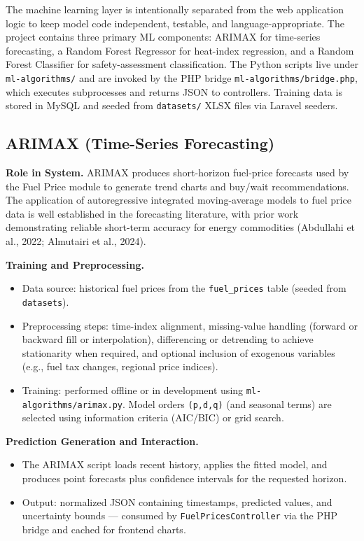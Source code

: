 \documentclass[12pt]{article}
\begin{document}
The machine learning layer is intentionally separated from the web application logic to keep model code independent, testable, and language-appropriate. The project contains three primary ML components: ARIMAX for time-series forecasting, a Random Forest Regressor for heat-index regression, and a Random Forest Classifier for safety-assessment classification. The Python scripts live under \texttt{ml-algorithms/} and are invoked by the PHP bridge \texttt{ml-algorithms/bridge.php}, which executes subprocesses and returns JSON to controllers. Training data is stored in MySQL and seeded from \texttt{datasets/} XLSX files via Laravel seeders.

\subsection{ARIMAX (Time-Series Forecasting)}

\noindent\textbf{Role in System.} ARIMAX produces short-horizon fuel-price forecasts used by the Fuel Price module to generate trend charts and buy/wait recommendations. The application of autoregressive integrated moving-average models to fuel price data is well established in the forecasting literature, with prior work demonstrating reliable short-term accuracy for energy commodities (Abdullahi et al., 2022; Almutairi et al., 2024).

\noindent\textbf{Training and Preprocessing.}
\begin{itemize}
    \item Data source: historical fuel prices from the \texttt{fuel\_prices} table (seeded from \texttt{datasets}).
    \item Preprocessing steps: time-index alignment, missing-value handling (forward or backward fill or interpolation), differencing or detrending to achieve stationarity when required, and optional inclusion of exogenous variables (e.g., fuel tax changes, regional price indices).
    \item Training: performed offline or in development using \texttt{ml-algorithms/arimax.py}. Model orders \texttt{(p,d,q)} (and seasonal terms) are selected using information criteria (AIC/BIC) or grid search.
\end{itemize}

\noindent\textbf{Prediction Generation and Interaction.}
\begin{itemize}
    \item The ARIMAX script loads recent history, applies the fitted model, and produces point forecasts plus confidence intervals for the requested horizon.
    \item Output: normalized JSON containing timestamps, predicted values, and uncertainty bounds --- consumed by \texttt{FuelPricesController} via the PHP bridge and cached for frontend charts.
\end{itemize}
\end{document}
